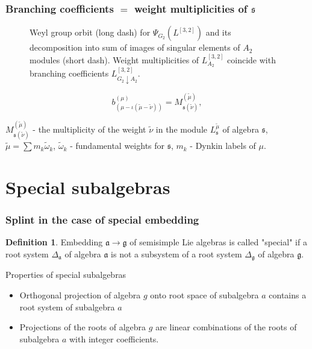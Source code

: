 \documentclass[pdftex]{beamer}
\newcommand{\gf}{\mathfrak{g}}
\newcommand{\af}{\mathfrak{a}}
\newcommand{\sfr}{\mathfrak{s}}
\theoremstyle{definition} \newtheorem{Def}{Definition}
\begin{document}
\begin{frame}
  \frametitle{Branching coefficients $=$ weight multiplicities of $\mathfrak{s}$}
  
  \begin{figure}[h!bt]
  \noindent{}\vspace{-0.3cm}
  \caption{Weyl group orbit  (long dash) for  $\Psi_{G_{2}}(L^{[3,2]})$ and its decomposition into sum of images of singular elements of   $A_{2}$ modules (short dash). Weight multiplicities of  $L^{[3,2]}_{A_{2}}$ coincide with branching coefficients $L^{[3,2]}_{G_{2}\downarrow A_{2}}$.}
 \label{fig:g2_splint}
\end{figure}\vspace{-0.3cm}
  \begin{equation*}
    b_{(\mu-\iota (\tilde{\mu}-\tilde{\nu}))}^{(\mu)}=M_{\sfr (\tilde{\nu})}^{(\tilde{\mu})}, 
  \end{equation*}

 $M^{(\tilde\mu)}_{\sfr(\tilde\nu)}$ - the multiplicity of the weight $\tilde\nu$ in the module $L^{\tilde\mu}_{\sfr}$ of algebra $\sfr$,\\
 $\tilde\mu=\sum m_k \tilde\omega_k$,  $\tilde\omega_k$ - fundamental weights for $\sfr$, $m_k$ - Dynkin labels of $\mu$.
\end{frame}
\section{Special subalgebras}
\begin{frame}
  \frametitle{Splint in the case of special embedding}
  \begin{Def}
    Embedding $\af \rightarrow \gf $ of semisimple Lie algebras is called "special"{ }if a root system $ \Delta _ {\af} $ of algebra $ \af $ is not a subsystem of a root system $ \Delta _ {\gf} $ of algebra $ \gf $.
  \end{Def}
  Properties of special subalgebras \cite {d}
    \begin{itemize}
    \item Orthogonal projection of algebra $g$ onto root space of subalgebra $a$ contains a root system of subalgebra $a$ 
    \item Projections of the roots of algebra $g$ are linear combinations of the roots of subalgebra $a$ with integer coefficients.
    \end{itemize}
\end{frame}
\end{document}
